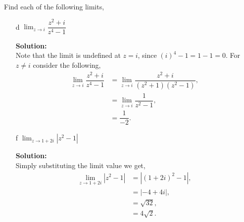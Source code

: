 \documentclass[12pt]{article}
\makeatletter
\theoremstyle{homework}
\newenvironment{exercise}[1]
{\def\@currentlabel{#1}\exercisecore}
{\endexercisecore}
\newcommand{\localhead}[1]{\par\smallskip\noindent\textbf{#1}\nobreak\\}%
\newcommand\solution{\localhead{Solution:}}
\makeatother
\begin{document}
\begin{exercise}{11} Find each of the following limits,
  \begin{enumerate}
    \item[d] $\lim_{z \to i} \dfrac{z^2 + i}{z^4 - 1}$\\
    \solution  Note that the limit is undefined at $z = i$, since $(i)^4 - 1 = 1 - 1 = 0$. For $z \neq i$
    consider the following, 
    \begin{align*}
      \lim_{z \to i} \dfrac{z^2 + i}{z^4 - 1} &= \lim_{z \to i} \dfrac{z^2 + i}{(z^2 + 1)(z^2 - 1)},\\
      &= \lim_{z \to i} \dfrac{1}{z^2 - 1}, \\
      &= \dfrac{1}{-2}. 
    \end{align*}

    \vspace{.15in}



    \item[f] $\lim_{z \to 1 + 2i}|z^2 - 1|$\\
    \solution Simply substituting the limit value we get, 
    \begin{align*}
      \lim_{z \to 1 + 2i}|z^2 - 1| &= |(1 + 2i)^2 - 1|,\\
      &=|-4 + 4i|,\\
      &=\sqrt{32},\\
      &=4\sqrt{2}.
    \end{align*}
  \end{enumerate}
\end{exercise}
\vspace{1in}
\end{document}
